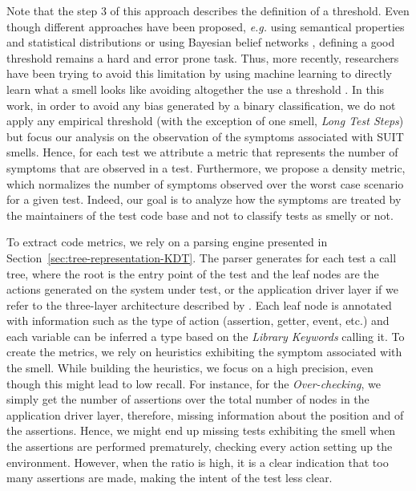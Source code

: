 Note that the step 3 of this approach describes the definition of a threshold. Even though different approaches have been proposed, \emph{e.g.} using semantical properties and statistical distributions \cite{Marinescu2004} or using Bayesian belief networks \cite{Khomh2009}, defining a good threshold remains a hard and error prone task. Thus, more recently, researchers have been trying to avoid this limitation by using machine learning to directly learn what a smell looks like avoiding altogether the use a threshold \cite{ArcelliFontana2016}. In this work, in order to avoid any bias generated by a binary classification, we do not apply any empirical threshold (with the exception of one smell, \emph{Long Test Steps}) but focus our analysis on the observation of the symptoms associated with SUIT smells. Hence, for each test we attribute a metric that represents the number of symptoms that are observed in a test. Furthermore, we propose a density metric, which normalizes the number of symptoms observed over the worst case scenario for a given test. Indeed, our goal is to analyze how the symptoms are treated by the maintainers of the test code base and not to classify tests as smelly or not.

To extract code metrics, we rely on a parsing engine presented in Section~\ref{sec:tree-representation-KDT}. The parser generates for each test a call tree, where the root is the entry point of the test and the leaf nodes are the actions generated on the system under test, or the application driver layer if we refer to the three-layer architecture described by \textcite{Humble2010}. Each leaf node is annotated with information such as the type of action (assertion, getter, event, etc.) and each variable can be inferred a type based on the \emph{Library Keywords} calling it. 
To create the metrics, we rely on heuristics exhibiting the symptom associated with the smell. While building the heuristics, we focus on a high precision, even though this might lead to low recall. 
For instance, for the \emph{Over-checking}, we simply get the number of assertions over the total number of nodes in the application driver layer, therefore, missing information about the position and of the assertions. Hence, we might end up missing tests exhibiting the smell when the assertions are performed prematurely, checking every action setting up the environment. However, when the ratio is high, it is a clear indication that too many assertions are made, making the intent of the test less clear.

